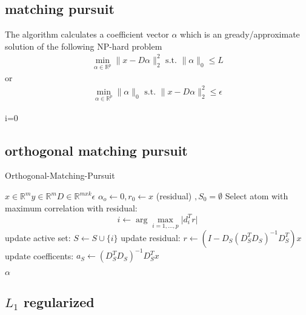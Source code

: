 \subsection{matching pursuit}
The algorithm calculates a coefficient vector $\alpha$ which is an gready/approximate solution of the following NP-hard problem
\begin{align}
\min_{\alpha\in\mathbb{R}^{p}}  \lVert x - D\alpha \rVert^{2}_{2} \textrm{ s.t. } \lVert \alpha \rVert_{0} \leq L
\end{align}
or
\begin{align}
\min_{\alpha\in\mathbb{R}^{p}}   \lVert \alpha \rVert_{0}   \textrm{ s.t. } \lVert x - D\alpha \rVert^{2}_{2} \leq \epsilon
\end{align}
\cite{Mallat1993}
\begin{algorithm}
\begin{algorithmic}
\STATE i=0
\end{algorithmic}
\end{algorithm}

\subsection{orthogonal matching pursuit}
\cite{Pati1993}
\label{sec:omp}


\begin{algorithm}
\caption{Orthogonal-Matching-Pursuit}
\begin{algorithmic}[1]
\REQUIRE $x \in \mathbb{R}^m y \in \mathbb{R}^m  D \in \mathbb{R}^{mxk} \epsilon$
\STATE $\alpha_o \gets 0, r_0 \gets x $ (residual) $, S_0=\emptyset$
\STATE Select atom with maximum correlation with residual: 
\begin{equation*}
i \gets \arg\max_{i=1,...,p} \lvert d_i^Tr \rvert
\end{equation*}
\STATE update active set: $S \gets S \cup \{i\} $
\STATE update residual: $r \gets \left(I-D_S\left( D_S^T D_S \right)^{-1} D_S^T \right)x$
\STATE update coefficents: $a_S \gets \left( D_S^T D_S \right)^{-1} D_S^T x $

\ENDFOR
\RETURN $\alpha$
\end{algorithmic}
\end{algorithm}

\subsection {$L_1$ regularized}
